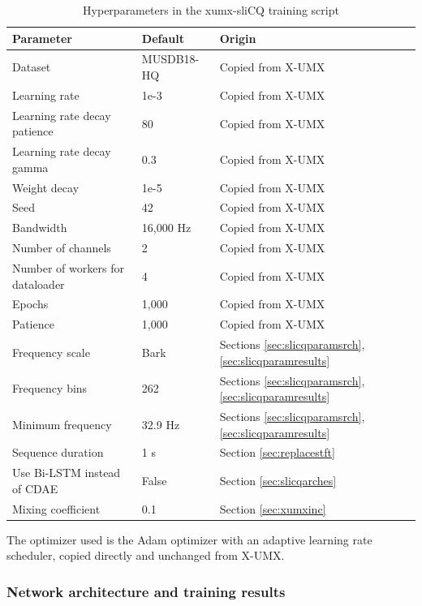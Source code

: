 \documentclass[report.tex]{subfiles}
\begin{document}
\begin{table}[ht]
	\centering
	\caption{Hyperparameters in the xumx-sliCQ training script}
	\label{table:xumxslicqparams}
	\begin{tabular}{ |l|l|l| }
	 \hline
		Parameter & Default & Origin \\
	 \hline
	 \hline
		Dataset & MUSDB18-HQ & Copied from X-UMX \\
	 \hline
		Learning rate & 1e-3 & Copied from X-UMX \\
	 \hline
		Learning rate decay patience & 80 & Copied from X-UMX \\
	 \hline
		Learning rate decay gamma & 0.3 & Copied from X-UMX \\
	 \hline
		Weight decay & 1e-5 & Copied from X-UMX \\
	 \hline
	 	Seed & 42 & Copied from X-UMX \\
	 \hline
		Bandwidth & 16,000 Hz & Copied from X-UMX \\
	 \hline
	 	Number of channels & 2 & Copied from X-UMX \\
	 \hline
	 	Number of workers for dataloader & 4 & Copied from X-UMX \\
	 \hline
		Epochs & 1,000 & Copied from X-UMX \\
	 \hline
		Patience & 1,000 & Copied from X-UMX \\
	 \hline
		Frequency scale & Bark & Sections \ref{sec:slicqparamsrch}, \ref{sec:slicqparamresults} \\
	 \hline
		Frequency bins & 262 & Sections \ref{sec:slicqparamsrch}, \ref{sec:slicqparamresults} \\
	 \hline
	 	Minimum frequency & 32.9 Hz & Sections \ref{sec:slicqparamsrch}, \ref{sec:slicqparamresults} \\
	 \hline
		Sequence duration & 1 s & Section \ref{sec:replacestft} \\
	 \hline
		Use Bi-LSTM instead of CDAE & False & Section \ref{sec:slicqarches} \\
	 \hline
		Mixing coefficient & 0.1 & Section \ref{sec:xumxinc} \\
	 \hline
\end{tabular}
\end{table}

The optimizer used is the Adam optimizer with an adaptive learning rate scheduler, copied directly and unchanged from X-UMX.

\subsubsection{Network architecture and training results}
\label{sec:networktraining}
\end{document}
